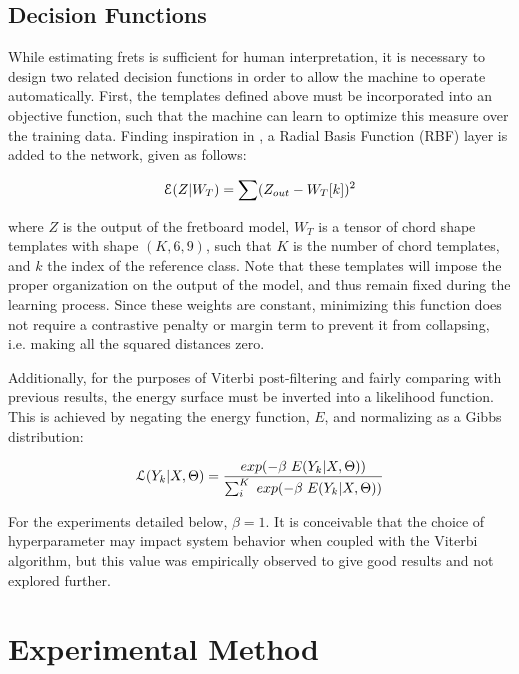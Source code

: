 \subsection{Decision Functions}
\label{subsec:loss}

While estimating frets is sufficient for human interpretation, it is necessary to design two related decision functions in order to allow the machine to operate automatically.
First, the templates defined above must be incorporated into an objective function, such that the machine can learn to optimize this measure over the training data.
Finding inspiration in \cite{LeCun1998Gradient}, a Radial Basis Function (RBF) layer is added to the network, given as follows:

\begin{equation}
\small
\mathcal{E}(Z \vert W_T) = \sum(Z_{out} - W_{T}[k])^2
\end{equation}

\noindent where $Z$ is the output of the fretboard model, $W_T$ is a tensor of chord shape templates with shape $(K, 6, 9)$, such that $K$ is the number of chord templates, and $k$ the index of the reference class.
Note that these templates will impose the proper organization on the output of the model, and thus remain fixed during the learning process.
Since these weights are constant, minimizing this function does not require a contrastive penalty or margin term to prevent it from collapsing, i.e. making all the squared distances zero.

Additionally, for the purposes of Viterbi post-filtering and fairly comparing with previous results, the energy surface must be inverted into a likelihood function.
This is achieved by negating the energy function, $E$, and normalizing as a Gibbs distribution:

\begin{equation}
\small
\mathcal{L}(Y_k \vert X, \Theta) = \frac{exp(-\beta~E(Y_k \vert X, \Theta))}{\sum_i^K~exp(-\beta~E(Y_k \vert X, \Theta))}
\end{equation}

For the experiments detailed below, $\beta=1$.
It is conceivable that the choice of hyperparameter may impact system behavior when coupled with the Viterbi algorithm, but this value was empirically observed to give good results and not explored further.


\section{Experimental Method}

